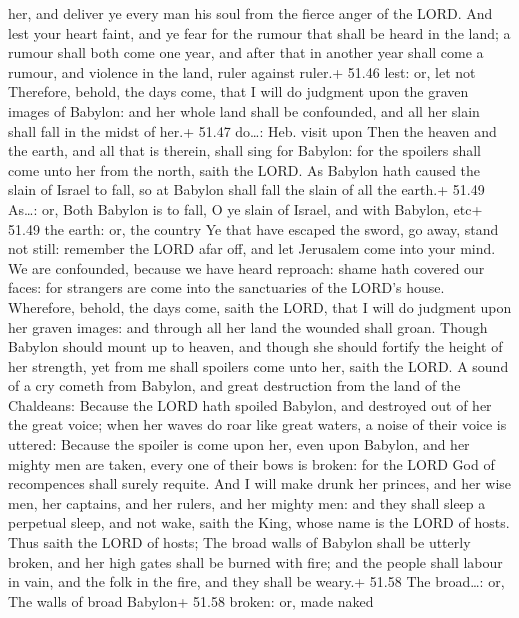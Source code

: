 her, and deliver ye every man his soul from the fierce anger of the
LORD.  And lest your heart faint, and ye fear for the
rumour that shall be heard in the land; a rumour shall both come one
year, and after that in another year shall come a rumour, and violence
in the land, ruler against ruler.+ 51.46 lest: or, let not 
Therefore, behold, the days come, that I will do judgment upon the
graven images of Babylon: and her whole land shall be confounded, and
all her slain shall fall in the midst of her.+ 51.47 do\ldots: Heb.
visit upon  Then the heaven and the earth, and all that is
therein, shall sing for Babylon: for the spoilers shall come unto her
from the north, saith the LORD.  As Babylon hath caused the
slain of Israel to fall, so at Babylon shall fall the slain of all the
earth.+ 51.49 As\ldots: or, Both Babylon is to fall, O ye slain of
Israel, and with Babylon, etc+ 51.49 the earth: or, the country
 Ye that have escaped the sword, go away, stand not still:
remember the LORD afar off, and let Jerusalem come into your mind.
 We are confounded, because we have heard reproach: shame
hath covered our faces: for strangers are come into the sanctuaries of
the LORD's house.  Wherefore, behold, the days come, saith
the LORD, that I will do judgment upon her graven images: and through
all her land the wounded shall groan.  Though Babylon
should mount up to heaven, and though she should fortify the height of
her strength, yet from me shall spoilers come unto her, saith the LORD.
 A sound of a cry cometh from Babylon, and great
destruction from the land of the Chaldeans:  Because the
LORD hath spoiled Babylon, and destroyed out of her the great voice;
when her waves do roar like great waters, a noise of their voice is
uttered:  Because the spoiler is come upon her, even upon
Babylon, and her mighty men are taken, every one of their bows is
broken: for the LORD God of recompences shall surely requite.
 And I will make drunk her princes, and her wise men, her
captains, and her rulers, and her mighty men: and they shall sleep a
perpetual sleep, and not wake, saith the King, whose name is the LORD of
hosts.  Thus saith the LORD of hosts; The broad walls of
Babylon shall be utterly broken, and her high gates shall be burned with
fire; and the people shall labour in vain, and the folk in the fire, and
they shall be weary.+ 51.58 The broad\ldots: or, The walls of broad
Babylon+ 51.58 broken: or, made naked

